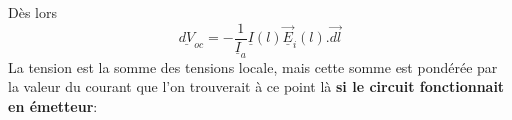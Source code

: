 	Dès lors
	\begin{equation}
	\underline{dV}_{oc} = -\dfrac{1}{\underline{I}_a}\underline{I}(l)\underline{\vec{E}}_i(l).\vec{dl}
	\end{equation}
	La tension est la somme des tensions locale, mais cette somme est pondérée par la valeur du courant 
	que l'on trouverait à ce point là \textbf{si le circuit fonctionnait en émetteur}:\\
